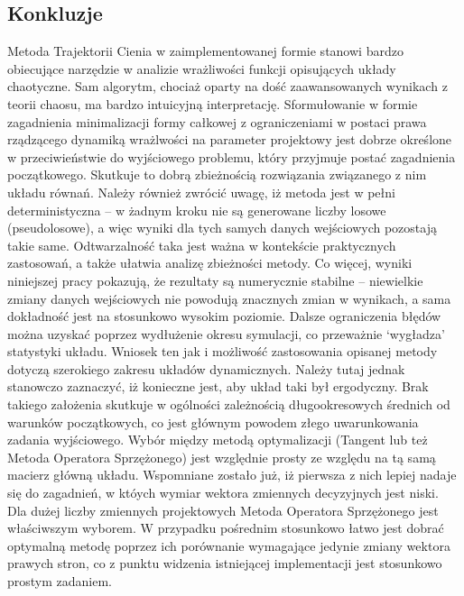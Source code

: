 \documentclass[12pt]{article}
\begin{document}
\subsection{Konkluzje}
Metoda Trajektorii Cienia w zaimplementowanej formie stanowi bardzo obiecujące narzędzie w analizie wrażliwości funkcji opisujących układy chaotyczne. Sam algorytm, chociaż oparty na dość zaawansowanych wynikach z teorii chaosu, ma bardzo intuicyjną interpretację. Sformułowanie w formie zagadnienia minimalizacji formy całkowej z ograniczeniami w postaci prawa rządzącego dynamiką wrażlwości na parameter projektowy jest dobrze określone w przeciwieństwie do wyjściowego problemu, który przyjmuje postać zagadnienia początkowego. Skutkuje to dobrą zbieżnością rozwiązania związanego z nim układu równań. \newline
Należy również zwrócić uwagę, iż metoda jest w pełni deterministyczna – w żadnym kroku nie są generowane liczby losowe (pseudolosowe), a więc wyniki dla tych samych danych wejściowych pozostają takie same. Odtwarzalność taka jest ważna w kontekście praktycznych zastosowań, a także ułatwia analizę zbieżności metody. Co więcej, wyniki niniejszej pracy pokazują, że rezultaty są numerycznie stabilne – niewielkie zmiany danych wejściowych nie powodują znacznych zmian w wynikach, a sama dokładność jest na stosunkowo wysokim poziomie. \newline
Dalsze ograniczenia błędów można uzyskać poprzez wydłużenie okresu symulacji, co przeważnie ‘wygładza’ statystyki układu. Wniosek ten jak i możliwość zastosowania opisanej metody dotyczą szerokiego zakresu układów dynamicznych. Należy tutaj jednak stanowczo zaznaczyć, iż konieczne jest, aby układ taki był ergodyczny. Brak takiego założenia skutkuje w ogólności zależnością długookresowych średnich od warunków początkowych, co jest głównym powodem złego uwarunkowania zadania wyjściowego. \newline
Wybór między metodą optymalizacji (Tangent lub też Metoda Operatora Sprzężonego) jest względnie prosty ze względu na tą samą macierz główną układu. Wspomniane zostało już, iż pierwsza z nich lepiej nadaje się do zagadnień, w któych wymiar wektora zmiennych decyzyjnych jest niski. Dla dużej liczby zmiennych projektowych Metoda Operatora Sprzężonego jest właściwszym wyborem. W przypadku pośrednim stosunkowo łatwo jest dobrać optymalną metodę poprzez ich porównanie wymagające jedynie zmiany wektora prawych stron, co z punktu widzenia istniejącej implementacji jest stosunkowo prostym zadaniem. \newline
\end{document}
